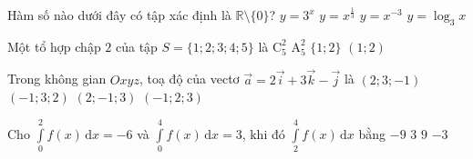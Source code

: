\begin{ex}%
	Hàm số nào dưới đây có tập xác định là $\mathbb{R} \setminus \{0\}$?
	\choice
	{$y=3^x$}
	{$y=x^{\tfrac{1}{3}}$}
	{\True $y=x^{-3}$}
	{$y=\log _3 x$}
\end{ex}

\begin{ex}%
	Một tổ hợp chập $2$ của tập $S=\{1;2;3;4;5\}$ là
	\choice
	{$\mathrm{C}_5^2$}
	{$\mathrm{A}_5^2$}
	{\True $\{1;2\}$}
	{$(1;2)$}
\end{ex}

\begin{ex}%
	Trong không gian $Oxyz$, toạ độ của vectơ $\overrightarrow{a}=2 \overrightarrow{i}+3 \overrightarrow{k}-\overrightarrow{j}$ là
	\choice
	{$(2;3;-1)$}
	{$(-1;3;2)$}
	{\True $(2;-1;3)$}
	{$(-1;2;3)$}
\end{ex}

\begin{ex}%
	Cho $\displaystyle\int\limits_0^2 f(x) \mathrm{\,d}x=-6$ và $\displaystyle\int\limits_0^4 f(x)\mathrm{\,d}x=3$, khi đó $\displaystyle\int\limits_2^4 f(x)\mathrm{\,d}x$ bằng
	\choice
	{$-9$}
	{$3$}
	{\True $9$}
	{$-3$}
\end{ex}

